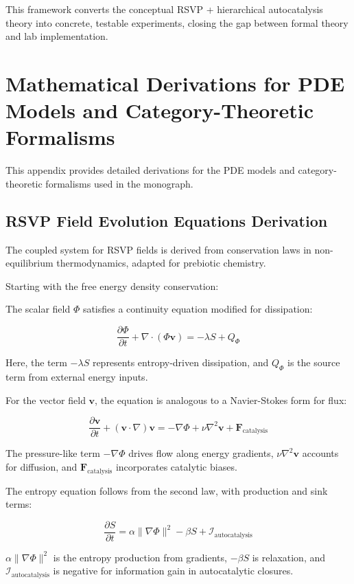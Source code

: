 \documentclass{book}
\begin{document}
This framework converts the conceptual RSVP + hierarchical autocatalysis theory into concrete, testable experiments, closing the gap between formal theory and lab implementation.

\appendix

\chapter{Mathematical Derivations for PDE Models and Category-Theoretic Formalisms}
This appendix provides detailed derivations for the PDE models and category-theoretic formalisms used in the monograph.

\section{RSVP Field Evolution Equations Derivation}
The coupled system for RSVP fields is derived from conservation laws in non-equilibrium thermodynamics, adapted for prebiotic chemistry.

Starting with the free energy density conservation:

The scalar field $\Phi$ satisfies a continuity equation modified for dissipation:

\[\frac{\partial \Phi}{\partial t} + \nabla \cdot (\Phi \mathbf{v}) = - \lambda S + Q_\Phi\]

Here, the term $- \lambda S$ represents entropy-driven dissipation, and $Q_\Phi$ is the source term from external energy inputs.

For the vector field $\mathbf{v}$, the equation is analogous to a Navier-Stokes form for flux:

\[\frac{\partial \mathbf{v}}{\partial t} + (\mathbf{v} \cdot \nabla) \mathbf{v} = - \nabla \Phi + \nu \nabla^2 \mathbf{v} + \mathbf{F}_{\text{catalysis}}\]

The pressure-like term $-\nabla \Phi$ drives flow along energy gradients, $\nu \nabla^2 \mathbf{v}$ accounts for diffusion, and $\mathbf{F}_{\text{catalysis}}$ incorporates catalytic biases.

The entropy equation follows from the second law, with production and sink terms:

\[\frac{\partial S}{\partial t} = \alpha \|\nabla \Phi\|^2 - \beta S + \mathcal{I}_{\text{autocatalysis}}\]

$\alpha \|\nabla \Phi\|^2$ is the entropy production from gradients, $-\beta S$ is relaxation, and $\mathcal{I}_{\text{autocatalysis}}$ is negative for information gain in autocatalytic closures.
\end{document}
